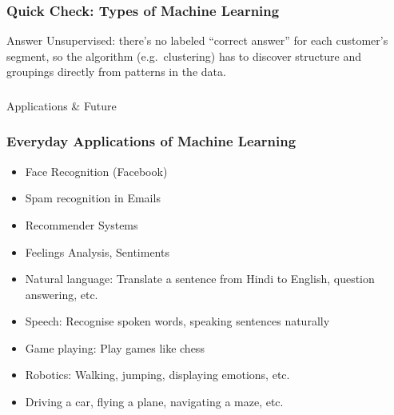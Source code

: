 \begin{frame}[fragile]\frametitle{Quick Check: Types of Machine Learning}
\begin{block}{Answer}
Unsupervised: there's no labeled ``correct answer'' for each customer's segment, so the algorithm (e.g.\ clustering) has to discover structure and groupings directly from patterns in the data.
\end{block}
\end{frame}

\begin{frame}[fragile]\frametitle{}
\begin{center}
{\Large Applications \& Future }
\end{center}
\end{frame}


\begin{frame}[fragile]\frametitle{Everyday Applications of Machine Learning}
\begin{itemize}
\item Face Recognition (Facebook)
\item Spam recognition in Emails
\item Recommender Systems
\item Feelings Analysis, Sentiments
\item Natural language: Translate a sentence from Hindi to English, 
question answering, etc. 
\item Speech: Recognise spoken words, speaking sentences naturally 
\item Game playing: Play games like chess 
\item Robotics: Walking, jumping, displaying emotions, etc. 
\item Driving a car, flying a plane, navigating a maze, etc.
\end{itemize}
\end{frame}


